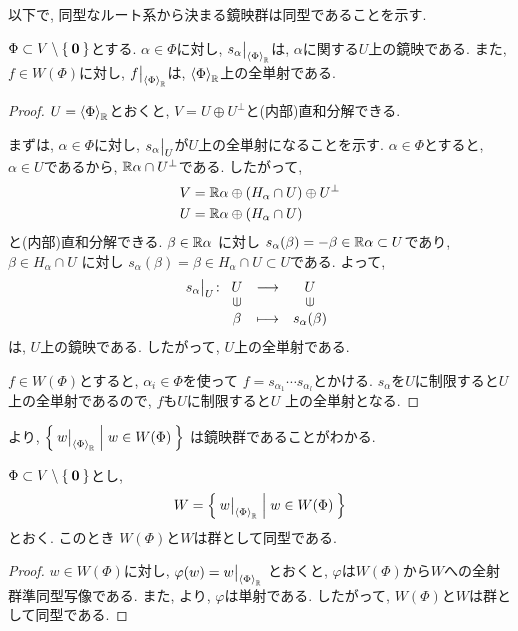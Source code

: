以下で,
同型なルート系から決まる鏡映群は同型であることを示す.
\begin{lemma}
  \label{lem:esspart}
  $\Phi\subset V\setminus\Set{\boldsymbol{0}}$とする.
  $\alpha\in\Phi$に対し,
  $s_\alpha\bigr|_{\Braket{\Phi}_{\mathbb{R}}}$は,
  $\alpha$に関する$U$上の鏡映である.
  また,
  $f\in W(\Phi)$に対し,
  $f\bigr|_{\Braket{\Phi}_{\mathbb{R}}}$は,
  $\Braket{\Phi}_{\mathbb{R}}$上の全単射である.
\end{lemma}
\begin{proof}
  $U=\Braket{\Phi}_{\mathbb{R}}$とおくと,
  $V=U\oplus U^\perp$と(内部)直和分解できる.

  まずは, $\alpha\in\Phi$に対し,
  $s_\alpha\bigr|_{U}$が$U$上の全単射になることを示す.
  $\alpha\in \Phi$とすると,
  $\alpha\in U$であるから,
  $\mathbb{R}\alpha\cap U^{\perp}$である.
  したがって,
  \begin{align*}
    V&=\mathbb{R}\alpha\oplus(H_\alpha\cap U)\oplus U^\perp\\
    U&=\mathbb{R}\alpha\oplus(H_\alpha\cap U)
  \end{align*}
  と(内部)直和分解できる.
  $\beta\in\mathbb{R}\alpha$ に対し
  $s_\alpha(\beta)=-\beta\in \mathbb{R}\alpha\subset U$であり,
  $\beta\in H_\alpha\cap U$ に対し
  $s_\alpha(\beta)=\beta\in H_\alpha\cap U\subset U$である.
  よって,
  \begin{align*}
    s_\alpha\restrictedto{U}\colon
    \Shazo{U}{U}
          {\beta}{s_\alpha(\beta)}
  \end{align*}
  は, $U$上の鏡映である.
  したがって, $U$上の全単射である.

  
  $f\in W(\Phi)$とすると,
  $\alpha_i\in \Phi$を使って
  $f=s_{\alpha_1}\cdots s_{\alpha_l}$とかける.
  $s_\alpha$を$U$に制限すると$U$上の全単射であるので,
  $f$も$U$に制限すると$U$
  上の全単射となる.
\end{proof}
より,
$\Set{w\bigr|_{\Braket{\Phi}_{\mathbb{R}}}|w\in W(\Phi)}$
は鏡映群であることがわかる.

\begin{lemma}
  $\Phi\subset V\setminus\Set{\boldsymbol{0}}$とし,
  \begin{align*}
    W=\Set{w\bigr|_{\Braket{\Phi}_{\mathbb{R}}}|w\in W(\Phi)}
  \end{align*}
  とおく.
  このとき
  $W(\Phi)$と$W$は群として同型である.
\end{lemma}
\begin{proof}
  $w\in W(\Phi)$に対し,
  $\varphi(w)=w\bigr|_{\Braket{\Phi}_{\mathbb{R}}}$
  とおくと,
  $\varphi$は$W(\Phi)$から$W$への全射群準同型写像である.
  また,
  より,
  $\varphi$は単射である.
  したがって,
  $W(\Phi)$と$W$は群として同型である.
\end{proof}



